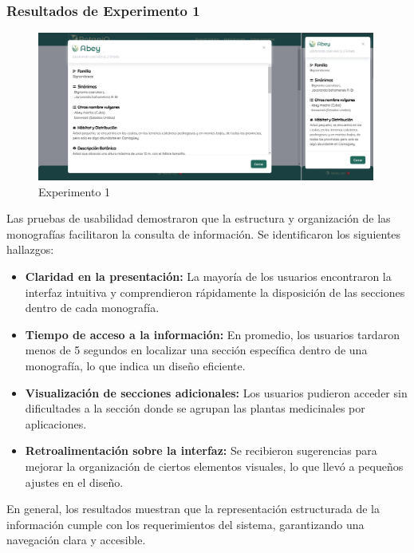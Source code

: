 \subsubsection*{Resultados de Experimento 1}
\begin{figure}[ht!]
    \centering
    \includegraphics[width=0.99\textwidth]{Images/exp1.png}
    \caption{Experimento 1}
    \label{fig:exp1}
\end{figure}
Las pruebas de usabilidad demostraron que la estructura y organización de las monografías facilitaron la consulta de información. 
Se identificaron los siguientes hallazgos:
\begin{itemize}
    \item \textbf{Claridad en la presentación:} La mayoría de los usuarios encontraron la interfaz intuitiva y comprendieron rápidamente 
    la disposición de las secciones dentro de cada monografía.
    \item \textbf{Tiempo de acceso a la información:} En promedio, los usuarios tardaron menos de 5 segundos en localizar una sección específica 
    dentro de una monografía, lo que indica un diseño eficiente.
    \item \textbf{Visualización de secciones adicionales:} Los usuarios pudieron acceder sin dificultades a la sección donde se agrupan las
    plantas medicinales por aplicaciones.
    \item \textbf{Retroalimentación sobre la interfaz:} Se recibieron sugerencias para mejorar la organización de ciertos elementos visuales, 
    lo que llevó a pequeños ajustes en el diseño.
\end{itemize}
En general, los resultados muestran que la representación estructurada de la información cumple con los requerimientos del sistema, 
garantizando una navegación clara y accesible.

